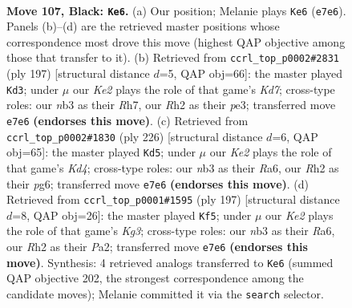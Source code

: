 \documentclass[11pt]{article}
\begin{document}
\clearpage

\begin{figure}[p]\centering
\begin{subfigure}{0.46\textwidth}\centering
\resizebox{\linewidth}{!}{%
\newchessgame
\chessboard[
  setfen={8/2R1k3/8/8/5K2/1N6/6Pr/8 b - - 79 107},
  showmover=false,
  pgfstyle=straightmove, color=movearrow, markmove={e7-e6}
]}
\caption{}
\end{subfigure}\hfill
\begin{subfigure}{0.46\textwidth}\centering
\resizebox{\linewidth}{!}{%
\newchessgame
\chessboard[
  setfen={8/7r/8/8/4p3/4P3/1R1k4/5K2 b - - 19 99},
  showmover=false,
  pgfstyle=straightmove, color=movearrow, markmove={d2-d3}
]}
\caption{}
\end{subfigure}
\\[4pt]
\begin{subfigure}{0.46\textwidth}\centering
\resizebox{\linewidth}{!}{%
\newchessgame
\chessboard[
  setfen={8/6k1/R5p1/8/3K1r2/7P/8/8 w - - 12 114},
  showmover=false,
  pgfstyle=straightmove, color=movearrow, markmove={d4-d5}
]}
\caption{}
\end{subfigure}\hfill
\begin{subfigure}{0.46\textwidth}\centering
\resizebox{\linewidth}{!}{%
\newchessgame
\chessboard[
  setfen={8/8/r2P2k1/8/8/3K4/p7/6R1 b - - 4 99},
  showmover=false,
  pgfstyle=straightmove, color=movearrow, markmove={g6-f5}
]}
\caption{}
\end{subfigure}
\caption{\textbf{Move 107, Black: \texttt{Ke6}.} (a) Our position; Melanie plays \texttt{Ke6} (\texttt{e7e6}). Panels (b)--(d) are the retrieved master positions whose correspondence most drove this move (highest QAP objective among those that transfer to it). (b) Retrieved from \texttt{ccrl\_top\_p0002\#2831} (ply 197) [structural distance $d$=5, QAP obj=66]: the master played \texttt{Kd3}; under $\mu$ our \emph{Ke2} plays the role of that game's \emph{Kd7}; cross-type roles: our \emph{n}b3 as their \emph{R}h7, our \emph{R}h2 as their \emph{p}e3; transferred move \texttt{e7e6} \textbf{(endorses this move)}. (c) Retrieved from \texttt{ccrl\_top\_p0002\#1830} (ply 226) [structural distance $d$=6, QAP obj=65]: the master played \texttt{Kd5}; under $\mu$ our \emph{Ke2} plays the role of that game's \emph{Kd4}; cross-type roles: our \emph{n}b3 as their \emph{R}a6, our \emph{R}h2 as their \emph{p}g6; transferred move \texttt{e7e6} \textbf{(endorses this move)}. (d) Retrieved from \texttt{ccrl\_top\_p0001\#1595} (ply 197) [structural distance $d$=8, QAP obj=26]: the master played \texttt{Kf5}; under $\mu$ our \emph{Ke2} plays the role of that game's \emph{Kg3}; cross-type roles: our \emph{n}b3 as their \emph{R}a6, our \emph{R}h2 as their \emph{P}a2; transferred move \texttt{e7e6} \textbf{(endorses this move)}. Synthesis: 4 retrieved analogs transferred to \texttt{Ke6} (summed QAP objective 202, the strongest correspondence among the candidate moves); Melanie committed it via the \texttt{search} selector.}
\label{fig:thought-m213}
\end{figure}
\end{document}
